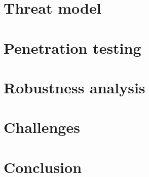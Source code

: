 \documentclass[12pt]{article}
\begin{document}
\section{Threat model}

\section{Penetration testing}

\section{Robustness analysis}

\section{Challenges}

\section{Conclusion}
\end{document}
